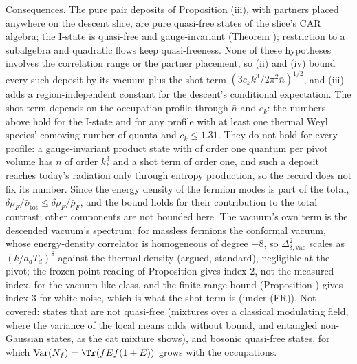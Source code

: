 Consequences. The pure pair deposits of Proposition (iii), with partners placed anywhere on the descent slice, are pure quasi-free states of the slice's CAR algebra; the I-state is quasi-free and gauge-invariant (Theorem ); restriction to a subalgebra and quadratic flows keep quasi-freeness. None of these hypotheses involves the correlation range or the partner placement, so (ii) and (iv) bound every such deposit by its vacuum plus the shot term $(3c_{k}k^{3}/2\pi^{2}\bar n)^{1/2}$, and (iii) adds a region-independent constant for the descent's conditional expectation. The shot term depends on the occupation profile through $\bar n$ and $c_{k}$: the numbers above hold for the I-state and for any profile with at least one thermal Weyl species' comoving number of quanta and $c_{k} \le 1.31$. They do not hold for every profile: a gauge-invariant product state with of order one quantum per pivot volume has $\bar n$ of order $k_{*}^{3}$ and a shot term of order one, and such a deposit reaches today's radiation only through entropy production, so the record does not fix its number. Since the energy density of the fermion modes is part of the total, $\delta\rho_{F}/\bar\rho_{\mathrm{tot}} \le \delta\rho_{F}/\bar\rho_{F}$, and the bound holds for their contribution to the total contrast; other components are not bounded here. The vacuum's own term is the descended vacuum's spectrum: for massless fermions the conformal vacuum, whose energy-density correlator is homogeneous of degree $-8$, so $\Delta_{\delta, \mathrm{vac}}^{2}$ scales as $(k/a_{d}T_{d})^{8}$ against the thermal density (argued, standard), negligible at the pivot; the frozen-point reading of Proposition  gives index $2$, not the measured index, for the vacuum-like class, and the finite-range bound (Proposition ) gives index $3$ for white noise, which is what the shot term is (under (FR)). Not covered: states that are not quasi-free (mixtures over a classical modulating field, where the variance of the local means adds without bound, and entangled non-Gaussian states, as the cat mixture shows), and bosonic quasi-free states, for which $\mathrm{Var}(N_{f}) = \Tr(fEf(1 + E))$ grows with the occupations.

